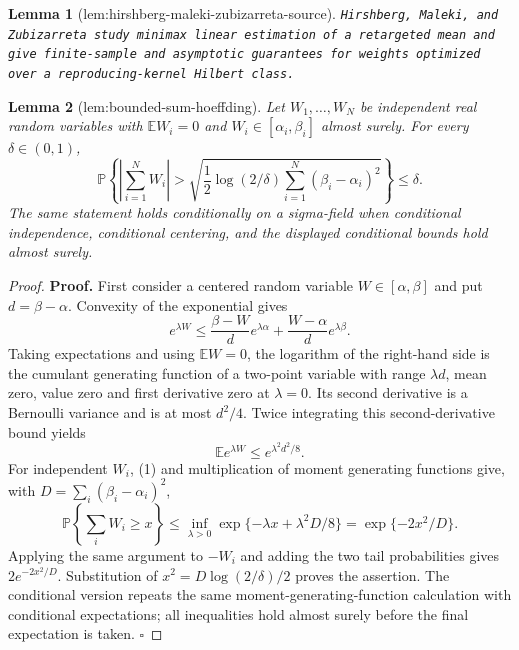 \documentclass{article}
\newtheorem{lemma}{Lemma}
\begin{document}
\begin{lemma}[lem:hirshberg-maleki-zubizarreta-source]\label{lem:hirshberg-maleki-zubizarreta-source}
\texttt{Hirshberg,\allowbreak{} Maleki,\allowbreak{} and Zubizarreta study minimax linear estimation of a retargeted mean and give finite-\allowbreak{}sample and asymptotic guarantees for weights optimized over a reproducing-\allowbreak{}kernel Hilbert class.}
\end{lemma}

\begin{lemma}[lem:bounded-sum-hoeffding]\label{lem:bounded-sum-hoeffding}
Let \(W_1,\ldots,W_N\) be independent real random variables with \(\mathbb E W_i=0\) and \(W_i\in[\alpha_i,\beta_i]\) almost surely. For every \(\delta\in(0,1)\),
\[
\mathbb P\!\left\{\left|\sum_{i=1}^N W_i\right|>
\sqrt{\frac12\log(2/\delta)\sum_{i=1}^N(\beta_i-\alpha_i)^2}\right\}\le\delta.
\]
The same statement holds conditionally on a sigma-field when conditional independence, conditional centering, and the displayed conditional bounds hold almost surely.
\end{lemma}
\begin{proof}
\textbf{Proof.}
First consider a centered random variable \(W\in[\alpha,\beta]\) and put \(d=\beta-\alpha\). Convexity of the exponential gives
\[
e^{\lambda W}\le\frac{\beta-W}{d}e^{\lambda\alpha}+\frac{W-\alpha}{d}e^{\lambda\beta}.
\]
Taking expectations and using \(\mathbb EW=0\), the logarithm of the right-hand side is the cumulant generating function of a two-point variable with range \(\lambda d\), mean zero, value zero and first derivative zero at \(\lambda=0\). Its second derivative is a Bernoulli variance and is at most \(d^2/4\). Twice integrating this second-derivative bound yields
\[
\mathbb E e^{\lambda W}\le e^{\lambda^2d^2/8}.
\tag{1}
\]
For independent \(W_i\), (1) and multiplication of moment generating functions give, with \(D=\sum_i(\beta_i-\alpha_i)^2\),
\[
\mathbb P\!\left\{\sum_iW_i\ge x\right\}
\le\inf_{\lambda>0}\exp\{-\lambda x+\lambda^2D/8\}
=\exp\{-2x^2/D\}.
\]
Applying the same argument to \(-W_i\) and adding the two tail probabilities gives \(2e^{-2x^2/D}\). Substitution of \(x^2=D\log(2/\delta)/2\) proves the assertion. The conditional version repeats the same moment-generating-function calculation with conditional expectations; all inequalities hold almost surely before the final expectation is taken. \(\square\)
\end{proof}
\end{document}
